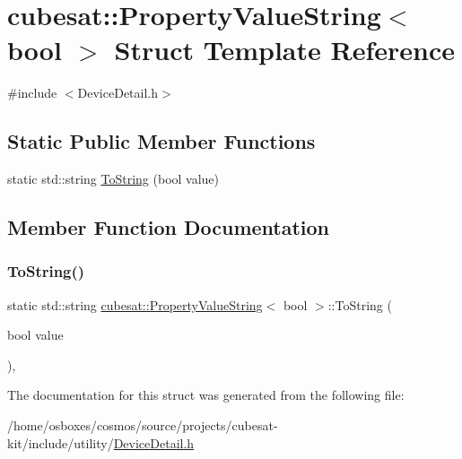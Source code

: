 \hypertarget{structcubesat_1_1PropertyValueString_3_01bool_01_4}{}\section{cubesat\+:\+:Property\+Value\+String$<$ bool $>$ Struct Template Reference}
\label{structcubesat_1_1PropertyValueString_3_01bool_01_4}


{\ttfamily \#include $<$Device\+Detail.\+h$>$}

\subsection*{Static Public Member Functions}
\begin{DoxyCompactItemize}
\item 
static std\+::string \hyperlink{structcubesat_1_1PropertyValueString_3_01bool_01_4_a4586f1a04e2e3f6930f3794dadfc545c}{To\+String} (bool value)
\end{DoxyCompactItemize}


\subsection{Member Function Documentation}
\mbox{\label{structcubesat_1_1PropertyValueString_3_01bool_01_4_a4586f1a04e2e3f6930f3794dadfc545c}} 
\subsubsection{\texorpdfstring{To\+String()}{ToString()}}
{\footnotesize\ttfamily static std\+::string \hyperlink{structcubesat_1_1PropertyValueString}{cubesat\+::\+Property\+Value\+String}$<$ bool $>$\+::To\+String (\begin{DoxyParamCaption}\item[{bool}]{value }\end{DoxyParamCaption})\hspace{0.3cm}{\ttfamily [inline]}, {\ttfamily [static]}}



The documentation for this struct was generated from the following file\+:\begin{DoxyCompactItemize}
\item 
/home/osboxes/cosmos/source/projects/cubesat-\/kit/include/utility/\hyperlink{DeviceDetail_8h}{Device\+Detail.\+h}\end{DoxyCompactItemize}
